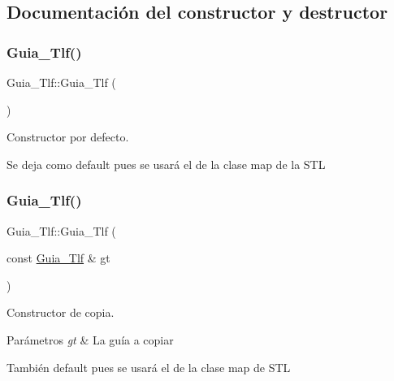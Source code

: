 \subsection{Documentación del constructor y destructor}
\mbox{\label{classGuia__Tlf_af710ea22fb968c5e87a3694f62c6bb4d}} 
\subsubsection{\texorpdfstring{Guia\+\_\+\+Tlf()}{Guia\_Tlf()}\hspace{0.1cm}{\footnotesize\ttfamily [1/2]}}
{\footnotesize\ttfamily Guia\+\_\+\+Tlf\+::\+Guia\+\_\+\+Tlf (\begin{DoxyParamCaption}{ }\end{DoxyParamCaption})\hspace{0.3cm}{\ttfamily [default]}}



Constructor por defecto. 

Se deja como default pues se usará el de la clase map de la S\+TL \mbox{\label{classGuia__Tlf_af5adb921ee6e321127a9bf0737f44ce3}} 
\subsubsection{\texorpdfstring{Guia\+\_\+\+Tlf()}{Guia\_Tlf()}\hspace{0.1cm}{\footnotesize\ttfamily [2/2]}}
{\footnotesize\ttfamily Guia\+\_\+\+Tlf\+::\+Guia\+\_\+\+Tlf (\begin{DoxyParamCaption}\item[{const \hyperlink{classGuia__Tlf}{Guia\+\_\+\+Tlf} \&}]{gt }\end{DoxyParamCaption})\hspace{0.3cm}{\ttfamily [default]}}



Constructor de copia. 


\begin{DoxyParams}{Parámetros}
{\em gt} & La guía a copiar\\
\hline
\end{DoxyParams}
También default pues se usará el de la clase map de S\+TL \mbox{\label{classGuia__Tlf_a07c35f4b0ca6d51079b700dbd28f9b7e}} 
